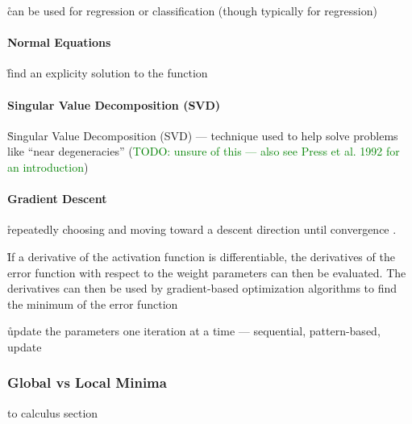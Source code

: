 \r{can be used for regression or classification (though typically for regression)}

 
\paragraph{Normal Equations}

\r{find an explicity solution to the function}

\paragraph{Singular Value Decomposition (SVD)}

\r{Singular Value Decomposition (SVD) --- technique used to help solve problems like ``near degeneracies'' (\textcolor{green}{TODO: unsure of this --- also see Press et al. 1992 for an introduction})}


\paragraph{Gradient Descent}

\r{repeatedly choosing and moving toward a descent direction until convergence} . 


\r{If a derivative of the activation function is differentiable, the derivatives of the error function with respect to the weight parameters can then be evaluated. The derivatives can then be used by gradient-based optimization algorithms to find the minimum of the error function }

\r{update the parameters one iteration at a time --- sequential, pattern-based, update}


\subsubsection{Global vs Local Minima}

\ALR to calculus section

